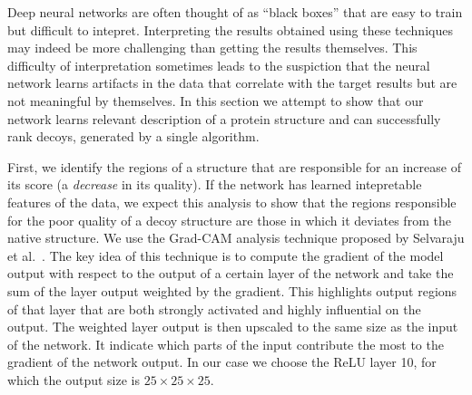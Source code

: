 Deep neural networks are often thought of as ``black boxes'' that are
easy to train but difficult to intepret. Interpreting the results
obtained using these techniques may indeed be more challenging than
getting the results themselves. This difficulty of interpretation
sometimes leads to the suspiction that the neural network learns
artifacts in the data that correlate with the target results but are
not meaningful by themselves.
%
In this section we attempt to show that our network learns relevant
description of a protein structure and can successfully rank decoys, 
generated by a single algorithm.

First, we identify the regions of a structure that are responsible for
an increase of its score (a \emph{decrease} in its quality). If the
network has learned intepretable features of the data, we expect this
analysis to show that the regions responsible for the poor quality of
a decoy structure are those in which it deviates from the native
structure.
%
We use the Grad-CAM analysis technique proposed by Selvaraju et
al.~\cite{selvaraju2016grad}. The key idea of this technique is to
compute the gradient of the model output with respect to the output of a certain layer of the network
and take the sum of the layer output weighted by the gradient.
%
%
This highlights output regions of that layer that are both strongly
activated and highly influential on the output.
%
The weighted layer output is then upscaled to the same size as the input of the network. 
It indicate which parts of the input contribute the most to the gradient of the network output.
%
In our case we choose the ReLU layer 10, for which
the output size is $25\times 25\times 25$.
